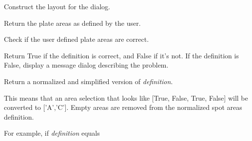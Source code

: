 \documentclass[letterpaper,10pt,english]{sphinxmanual}
\begin{document}
\begin{fulllineitems}
\begin{fulllineitems}
\end{fulllineitems}


\begin{fulllineitems}
\label{setlyze/gui:setlyze.gui.DefinePlateAreas.create_layout}
Construct the layout for the dialog.

\end{fulllineitems}


\begin{fulllineitems}
\label{setlyze/gui:setlyze.gui.DefinePlateAreas.get_selection}
Return the plate areas as defined by the user.

\end{fulllineitems}


\begin{fulllineitems}
\label{setlyze/gui:setlyze.gui.DefinePlateAreas.iscorrect}
Check if the user defined plate areas are correct.

Return True if the definition is correct, and False if it's not.
If the definition is False, display a message dialog describing
the problem.

\end{fulllineitems}


\begin{fulllineitems}
\label{setlyze/gui:setlyze.gui.DefinePlateAreas.normalize}
Return a normalized and simplified version of \emph{definition}.

This means that an area selection that looks like
{[}True, False, True, False{]} will be converted to {[}'A','C'{]}. Empty
areas are removed from the normalized spot areas definition.

For example, if \emph{definition} equals


\end{fulllineitems}
\end{fulllineitems}
\end{document}
